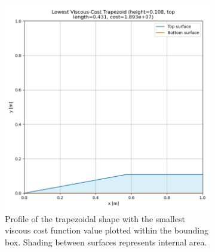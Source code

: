\documentclass[11pt]{article}
\begin{document}
\begin{figure}[H]
\begin{subfigure}[b]{0.44\textwidth}
    \includegraphics[width=\linewidth]{../results/viscous/lowest_cost_trapezoid.png}
    \caption{Profile of the trapezoidal shape with the smallest viscous cost function value plotted within the bounding box. Shading between surfaces represents internal area.}
    \label{fig:vis-trapezoid-b}
\end{subfigure}
\caption{}
\label{fig:vis-trapezoid}
\end{figure}
\end{document}
